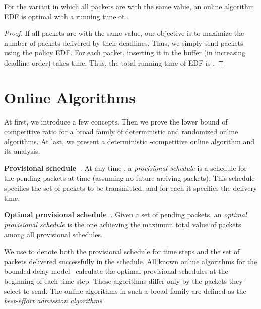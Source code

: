 \documentclass[final, 11pt]{article}
\begin{document}
\begin{corollary}
For the variant in which all packets are with the same value, an online algorithm EDF is optimal with a running time of .
\end{corollary}

\begin{proof}
If all packets are with the same value, our objective is to maximize the number of packets delivered by their deadlines. Thus, we simply send packets using the policy EDF. For each packet, inserting it in the buffer (in increasing deadline order) takes  time. Thus, the total running time of EDF is . 
\end{proof}



\section{Online Algorithms}
\label{sec:online}

At first, we introduce a few concepts. Then we prove the lower bound  of competitive ratio for a broad family of deterministic and randomized online algorithms. At last, we present a deterministic -competitive online algorithm and its analysis.

\begin{Definition}
{\bf Provisional schedule~\cite{CJST07a, EW07}}. At any time , a {\em provisional schedule} is a schedule for the pending packets at time  (assuming no future arriving packets). This schedule specifies the set of packets to be transmitted, and for each it specifies the delivery time.
\end{Definition}

\begin{Definition}
{\bf Optimal provisional schedule~\cite{CJST07a, EW07}}. Given a set of pending packets, an {\em optimal provisional schedule} is the one achieving the maximum total value of packets among all provisional schedules.
\end{Definition}

We use  to denote both the provisional schedule for time steps  and the set of packets delivered successfully in the schedule. All known online algorithms for the bounded-delay model~\cite{LSS05, CJST07, LSS07, EW07} calculate the optimal provisional schedules at the beginning of each time step. These algorithms differ only by the packets they select to send. The online algorithms in such a broad family are defined as the {\em best-effort admission algorithms}.
\end{document}
